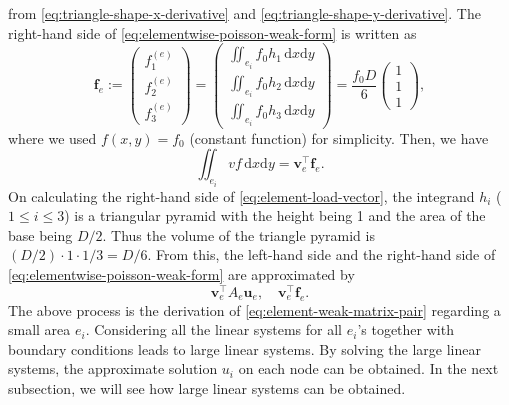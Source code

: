 {from \eqref{eq:triangle-shape-x-derivative} and \eqref{eq:triangle-shape-y-derivative}. The right-hand side of \eqref{eq:elementwise-poisson-weak-form} is written as}
\begin{equation}\label{eq:element-load-vector}
\boldsymbol{f}_e:=\begin{pmatrix}f_1^{(e)}\\f_2^{(e)}\\f_3^{(e)}\end{pmatrix}
=\begin{pmatrix}\iint_{e_i}f_0h_1\,\mathrm dx\mathrm dy\\\iint_{e_i}f_0h_2\,\mathrm dx\mathrm dy\\\iint_{e_i}f_0h_3\,\mathrm dx\mathrm dy\end{pmatrix}
=\frac{f_0D}{6}\begin{pmatrix}1\\1\\1\end{pmatrix},
\end{equation}
{where we used $f(x,y)=f_0$ (constant function) for simplicity. Then, we have}
\[\iint_{e_i}vf\,\mathrm dx\mathrm dy=\boldsymbol{v}_e^{\top}\boldsymbol{f}_e.\]
{On calculating the right-hand side of \eqref{eq:element-load-vector}, the integrand $h_i$ ($1\le i\le3$) is a triangular pyramid with the height being 1 and the area of the base being $D/2$. Thus the volume of the triangle pyramid is $(D/2)\cdot1\cdot1/3=D/6$. From this, the left-hand side and the right-hand side of \eqref{eq:elementwise-poisson-weak-form} are approximated by}
\begin{equation}\label{eq:element-weak-matrix-pair}
\boldsymbol{v}_e^{\top}A_e\boldsymbol{u}_e,\quad\boldsymbol{v}_e^{\top}\boldsymbol{f}_e.
\end{equation}
{The above process is the derivation of \eqref{eq:element-weak-matrix-pair} regarding a small area $e_i$. Considering all the linear systems for all $e_i$'s together with boundary conditions leads to large linear systems. By solving the large linear systems, the approximate solution $u_i$ on each node can be obtained. In the next subsection, we will see how large linear systems can be obtained.}
